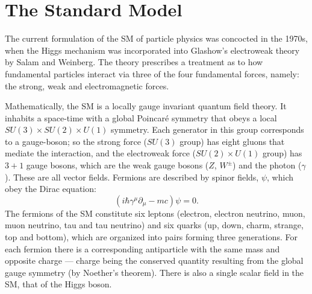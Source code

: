 \section{The Standard Model}
The current formulation of the SM of particle physics was concocted in the 1970s, when the Higgs
mechanism was incorporated into Glashow's electroweak theory by Salam and Weinberg.
The theory prescribes a treatment
as to how fundamental particles interact via three of the four
fundamental forces, namely: the strong, weak and electromagnetic forces.


Mathematically, the SM is a locally gauge invariant quantum field theory.
It inhabits a space-time with a global Poincar\'e symmetry that obeys a local
$SU(3)\times SU(2)\times U(1)$ symmetry.
Each generator in this group corresponds to a gauge-boson; so the strong force ($SU(3)$ group) has
eight gluons that mediate the interaction, and the electroweak force ($SU(2)\times U(1)$ group) has
$3+1$ gauge bosons, which are the weak gauge bosons ($Z$, $W^\pm$) and the photon ($\gamma$).
These are all vector fields.
Fermions are described by spinor fields, $\psi$, which obey the Dirac equation:
\begin{equation}
  (i\hbar\gamma^\mu\partial_\mu - mc)\psi = 0.
  \label{th:eq:dirac}
\end{equation}
The fermions of the SM constitute six leptons (electron, electron neutrino, muon, muon neutrino,
tau and tau neutrino) and six quarks (up, down, charm, strange, top and bottom), which are
organized into pairs forming three generations.
For each fermion there is a corresponding antiparticle with the same mass and opposite charge ---
charge being the conserved quantity resulting from the global gauge symmetry (by Noether's
theorem).
There is also a single scalar field in the SM, that of the Higgs boson.

